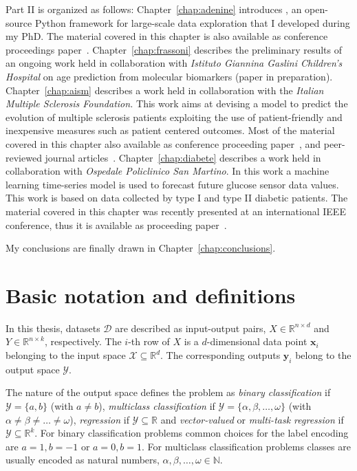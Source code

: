 Part II is organized as follows:
Chapter~\ref{chap:adenine} introduces \ade, an open-source Python framework for large-scale data exploration that I developed during my PhD.
The material covered in this chapter is also available as conference proceedings paper~\cite{fiorini2017adenine}.
Chapter~\ref{chap:frassoni} describes the preliminary results of an ongoing work held in collaboration with \textit{Istituto Giannina Gaslini Children's Hospital} on age prediction from molecular biomarkers (paper in preparation).
Chapter~\ref{chap:aism} describes a work held in collaboration with the \textit{Italian Multiple Sclerosis Foundation.} This work aims at devising a model to predict the evolution of multiple sclerosis patients exploiting the use of patient-friendly and inexpensive measures such as patient centered outcomes.
Most of the material covered in this chapter also available as conference proceeding paper~\cite{fiorini2015machine}, and peer-reviewed journal articles~\cite{brichetto2015improving, fiorini2016temporal, brichetto2016predicting, pmlr-v68-fiorini17a, tacchino2017multiple}.
Chapter~\ref{chap:diabete} describes a work held in collaboration with \textit{Ospedale Policlinico San Martino}. In this work a machine learning time-series model is used to forecast future glucose sensor data values. This work is based on data collected by type I and type II diabetic patients.
The material covered in this chapter was recently presented at an international IEEE conference, thus it is available as proceeding paper~\cite{fiorini2017data}.

My conclusions are finally drawn in Chapter~\ref{chap:conclusions}.

\chapter{Basic notation and definitions} \label{sec:notation}
In this thesis, datasets $\mathcal{D}$ are described as input-output pairs, $X \in \mathbb{R}^{n \times d}$ and $Y \in \mathbb{R}^{n \times k}$, respectively.
The $i$-th row of $X$ is a $d$-dimensional data point $\bm{x}_{i}$ belonging to the input space $\mathcal{X}\subseteq\mathds{R}^d$. The corresponding outputs $\bm{y}_{i}$ belong to the output space $\mathcal{Y}$.

The nature of the output space defines the problem as \textit{binary classification} if  $\mathcal{Y} = \{a,b\}$ (with $a\neq b$), \textit{multiclass classification} if
$\mathcal{Y} = \{\alpha,\beta,\dots,\omega\}$
(with $\alpha \neq \beta \neq \dots \neq \omega$),
\textit{regression} if $\mathcal{Y}\subseteq\mathds{R}$ and
\textit{vector-valued} or \textit{multi-task regression} if $\mathcal{Y}\subseteq\mathds{R}^k$.
For binary classification problems common choices for the label encoding are $a=1, b=-1$ or $a=0, b=1$.
For multiclass classification problems classes are usually encoded as natural numbers, \ie $\alpha, \beta, \dots, \omega \in \mathbb{N}$.

